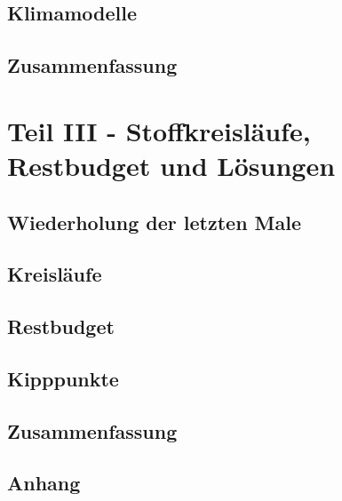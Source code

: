 	\subsection{Klimamodelle}
	
	\subsection{Zusammenfassung}
	
	\section{Teil III - Stoffkreisläufe, Restbudget und Lösungen}
	\subsection{Wiederholung der letzten Male}
	
	
	
	\subsection{Kreisläufe}
	
	
	\subsection{Restbudget}
	
	\subsection{Kipppunkte}
	
	\subsection{Zusammenfassung}
	
	
	\subsection{Anhang}
	


